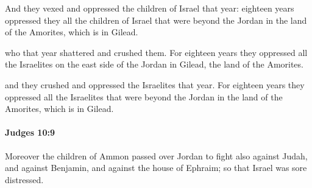 			\begin{versebox}
					\item[BHS] 
					\item[ASV] And they vexed and oppressed the children of Israel that year: eighteen years oppressed they all the children of Israel that were beyond the Jordan in the land of the Amorites, which is in Gilead.
					\item[NIV] who that year shattered and crushed them. For eighteen years they oppressed all the Israelites on the east side of the Jordan in Gilead, the land of the Amorites.
					\item[NRSV] and they crushed and oppressed the Israelites that year. For eighteen years they oppressed all the Israelites that were beyond the Jordan in the land of the Amorites, which is in Gilead.
			\end{versebox}

		\paragraph{Judges 10:9} %
			\label{JUDGES-10-9}

			Moreover the children of Ammon passed over Jordan to fight also against Judah, and against Benjamin, and against the house of Ephraim; so that Israel was sore distressed.

